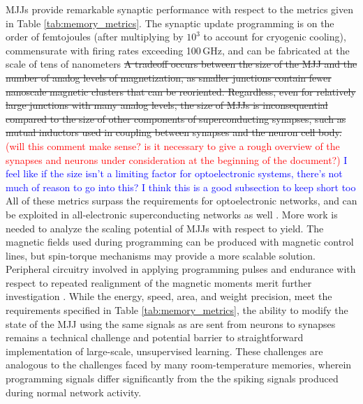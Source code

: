 \documentclass[twocolumn]{article}
\begin{document}
MJJs provide remarkable synaptic performance with respect to the metrics given in Table \ref{tab:memory_metrics}. The synaptic update programming is on the order of femtojoules (after multiplying by $10^3$ to account for cryogenic cooling), commensurate with firing rates exceeding 100\,GHz, and can be fabricated at the scale of tens of nanometers \sout{A tradeoff occurs between the size of the MJJ and the number of analog levels of magnetization, as smaller junctions contain fewer nanoscale magnetic clusters that can be reoriented. Regardless, even for relatively large junctions with many analog levels, the size of  MJJs is inconsequential compared to the size of other components of superconducting synapses, such as mutual inductors used in coupling between synapses and the neuron cell body.} \textcolor{red}{(will this comment make sense? is it necessary to give a rough overview of the synapses and neurons under consideration at the beginning of the document?)} \textcolor{blue}{I feel like if the size isn't a limiting factor for optoelectronic systems, there's not much of reason to go into this? I think this is a good subsection to keep short too} All of these metrics surpass the requirements for optoelectronic networks, and can be exploited in all-electronic superconducting networks as well \cite{schneider2018tutorial}. More work is needed to analyze the scaling potential of MJJs with respect to yield. The magnetic fields used during programming can be produced with magnetic control lines, but spin-torque mechanisms may provide a more scalable solution. Peripheral circuitry involved in applying programming pulses and endurance with respect to repeated realignment of the magnetic moments merit further investigation \cite{schneider2018ultralow}. While the energy, speed, area, and weight precision, meet the requirements specified in Table \ref{tab:memory_metrics}, the ability to modify the state of the MJJ using the same signals as are sent from neurons to synapses remains a technical challenge and potential barrier to straightforward implementation of large-scale, unsupervised learning. These challenges are analogous to the challenges faced by many room-temperature memories, wherein programming signals differ significantly from the the spiking signals produced during normal network activity.
\end{document}
